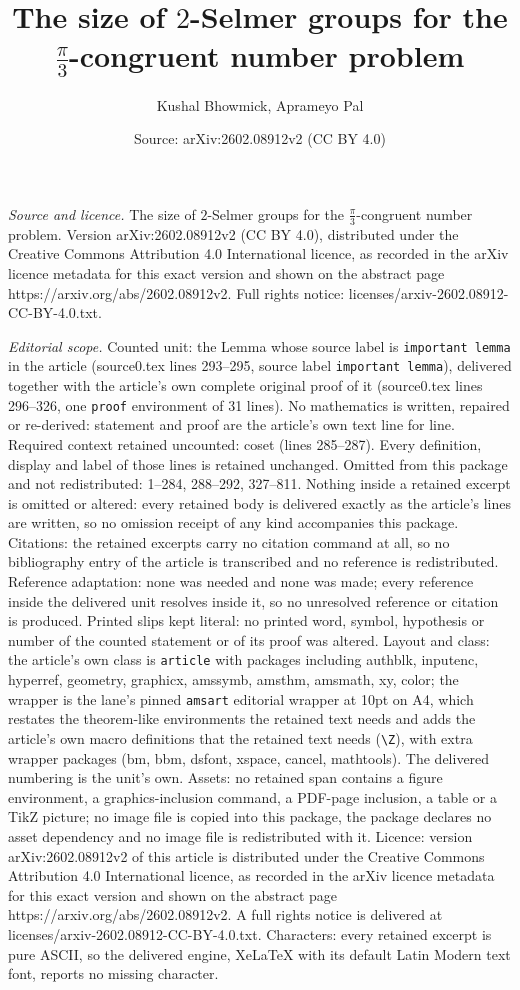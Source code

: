 \documentclass[10pt,a4paper]{amsart}
\title[The size of $2$-Selmer groups for the $\frac{\pi}{3}$-congru]{The size of $2$-Selmer groups for the $\frac{\pi}{3}$-congruent number problem}
\author{Kushal Bhowmick, Aprameyo Pal}
\date{Source: arXiv:2602.08912v2 (CC BY 4.0)}
\begin{document}
\maketitle

\noindent\emph{Source and licence.} The size of $2$-Selmer groups for the $\frac{\pi}{3}$-congruent number problem. Version arXiv:2602.08912v2 (CC BY 4.0), distributed under the Creative Commons Attribution 4.0 International licence, as recorded in the arXiv licence metadata for this exact version and shown on the abstract page https://arxiv.org/abs/2602.08912v2. Full rights notice: licenses/arxiv-2602.08912-CC-BY-4.0.txt.\par\smallskip

\noindent\textit{Editorial scope.} Counted unit: the Lemma whose source label is \texttt{important lemma} in the article (source0.tex lines 293--295, source label \texttt{important lemma}), delivered together with the article's own complete original proof of it (source0.tex lines 296--326, one \texttt{proof} environment of 31 lines). No mathematics is written, repaired or re-derived: statement and proof are the article's own text line for line. Required context retained uncounted: coset (lines 285--287). Every definition, display and label of those lines is retained unchanged. Omitted from this package and not redistributed: 1--284, 288--292, 327--811. Nothing inside a retained excerpt is omitted or altered: every retained body is delivered exactly as the article's lines are written, so no omission receipt of any kind accompanies this package. Citations: the retained excerpts carry no citation command at all, so no bibliography entry of the article is transcribed and no reference is redistributed. Reference adaptation: none was needed and none was made; every reference inside the delivered unit resolves inside it, so no unresolved reference or citation is produced. Printed slips kept literal: no printed word, symbol, hypothesis or number of the counted statement or of its proof was altered. Layout and class: the article's own class is \texttt{article} with packages including authblk, inputenc, hyperref, geometry, graphicx, amssymb, amsthm, amsmath, xy, color; the wrapper is the lane's pinned \texttt{amsart} editorial wrapper at 10pt on A4, which restates the theorem-like environments the retained text needs and adds the article's own macro definitions that the retained text needs (\texttt{\textbackslash Z}), with extra wrapper packages (bm, bbm, dsfont, xspace, cancel, mathtools). The delivered numbering is the unit's own. Assets: no retained span contains a figure environment, a graphics-inclusion command, a PDF-page inclusion, a table or a TikZ picture; no image file is copied into this package, the package declares no asset dependency and no image file is redistributed with it. Licence: version arXiv:2602.08912v2 of this article is distributed under the Creative Commons Attribution 4.0 International licence, as recorded in the arXiv licence metadata for this exact version and shown on the abstract page https://arxiv.org/abs/2602.08912v2. A full rights notice is delivered at licenses/arxiv-2602.08912-CC-BY-4.0.txt. Characters: every retained excerpt is pure ASCII, so the delivered engine, XeLaTeX with its default Latin Modern text font, reports no missing character.
\end{document}
